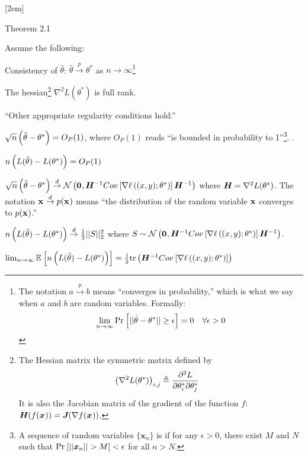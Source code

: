 \documentclass[11pt]{article}
\renewcommand\vec[2][]{\bm{#2}_{#1}}
\begin{document}
[2em]
\begin{itemdefinition}{Theorem 2.1}
	{Assume the following: \begin{compactitem}
			\item Consistency of $\hat{\theta}$: $\hat{\theta}  \overset{p}{\to} \theta^{*}$ as $n \to \infty$\footnote{The notation $a \overset{p}{\to} b$ means ``converges in probability,'' which is what we say when $a$ and $b$ are random variables. Formally:\begin{align} 
				\lim_{n \to \infty} \text{Pr}_{}\left[  || \hat \theta - \theta^* || \geq \epsilon \right] = 0 \quad \forall \epsilon > 0
		 	\end{align}} 
			\item The hessian\footnote{The Hessian matrix the symmetric matrix defined by \begin{align}
					\left(  \nabla^2 L(\theta^*)  \right)_{i,j} &\triangleq \frac{\partial^2 L}{\partial \theta^*_{i} \partial \theta^*_{j}}
			\end{align} It is also the Jacobian matrix of the gradient of the function $f$: $\matr H(f(\vec x)) = \matr J (\nabla f(\vec x))$.} $\nabla^{2}L(\theta^{*})$ is full rank. 
			\item ``Other appropriate regularity conditions hold.''
		\end{compactitem}}
	
	\item $\sqrt{n}\left(  \hat\theta - \theta^* \right) = O_P(1)$, where $O_P(1)$ reads ``is bounded in probability to 1''\footnote{A sequence of random variables  $\{\vec[n]{x} \} $ is  if for any $\epsilon > 0$, there exist $M$ and $N$ such that $\Prob{ ||\vec[n]{x}|| >M }  < \epsilon$ for all $n > N$. }. .
	
	\item $n \left(  L(\hat\theta) - L(\theta^*)  \right) = O_P(1)$
	
	\item $\sqrt{n} \lr{ \hat\theta - \theta^*}  \overset{d}{\to} \Gauss{\vec 0,   \minv{H} Cov\left[  \nabla \ell\lr{(x, y); \theta^*} \right]   \minv{H}    }$ where $\bm{H}_{} = \nabla^2 L(\theta^*)$. The notation $\mathbf{x}_{} \overset{d}{\to} p(\mathbf{x}_{})$ means ``the distribution of the random variable $\mathbf{x}_{}$ converges to $p(\mathbf{x}_{})$.''
	
	\item $n \left(  L(\hat\theta) - L(\theta^*)  \right) \overset{d}{\to} \frac{1}{2} ||S||_2^2$ where $S \sim \Gauss{\vec 0,   \minv{H} Cov\left[  \nabla \ell\lr{(x, y); \theta^*} \right]   \minv{H}    }$. 
	
	\item $\lim_{n \to \infty} \mathbb{E}_{}\left[   n \left(  L(\hat\theta) - L(\theta^*)  \right) \right] = \frac{1}{2} \text{tr}\left(    \bm{H}_{}^{-1} Cov\left[  \nabla \ell\left( (x, y); \theta^* \right) \right]   \right)$
\end{itemdefinition}
\end{document}
